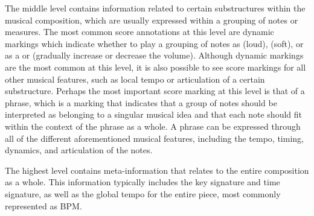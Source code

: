 The middle level contains information related to certain substructures within the musical composition, which are usually expressed within a grouping of notes or measures. The most common score annotations at this level are dynamic markings which indicate whether to play a grouping of notes as  (loud),  (soft), or as a  or  (gradually increase or decrease the volume). %
Although dynamic markings are the most common at this level, it is also possible to see score markings for all other musical features, such as local tempo or articulation of a certain substructure. Perhaps the most important score marking at this level is that of a phrase, which is a marking that indicates that a group of notes should be interpreted as belonging to a singular musical idea and that each note should fit within the context of the phrase as a whole. A phrase can be expressed through all of the different aforementioned musical features, including the tempo, timing, dynamics, and articulation of the notes.

The highest level contains meta-information that relates to the entire composition as a whole. This information typically includes the key signature and time signature, as well as the global tempo for the entire piece, most commonly represented as BPM. 



